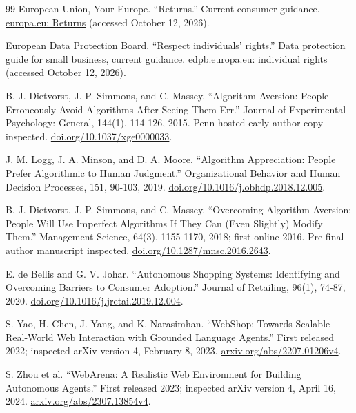 \documentclass{article}
\begin{document}
\begin{thebibliography}{99}
European Union, Your Europe. ``Returns.'' Current consumer guidance. \href{https://europa.eu/youreurope/citizens/consumers/shopping/returns/index_en.htm}{europa.eu: Returns} (accessed October 12, 2026).

European Data Protection Board. ``Respect individuals' rights.'' Data protection guide for small business, current guidance. \href{https://www.edpb.europa.eu/sme/be-compliant/respect-individuals-rights_en}{edpb.europa.eu: individual rights} (accessed October 12, 2026).

B. J. Dietvorst, J. P. Simmons, and C. Massey. ``Algorithm Aversion: People Erroneously Avoid Algorithms After Seeing Them Err.'' Journal of Experimental Psychology: General, 144(1), 114-126, 2015. Penn-hosted early author copy inspected. \href{https://doi.org/10.1037/xge0000033}{doi.org/10.1037/xge0000033}.

J. M. Logg, J. A. Minson, and D. A. Moore. ``Algorithm Appreciation: People Prefer Algorithmic to Human Judgment.'' Organizational Behavior and Human Decision Processes, 151, 90-103, 2019. \href{https://doi.org/10.1016/j.obhdp.2018.12.005}{doi.org/10.1016/j.obhdp.2018.12.005}.

B. J. Dietvorst, J. P. Simmons, and C. Massey. ``Overcoming Algorithm Aversion: People Will Use Imperfect Algorithms If They Can (Even Slightly) Modify Them.'' Management Science, 64(3), 1155-1170, 2018; first online 2016. Pre-final author manuscript inspected. \href{https://doi.org/10.1287/mnsc.2016.2643}{doi.org/10.1287/mnsc.2016.2643}.

E. de Bellis and G. V. Johar. ``Autonomous Shopping Systems: Identifying and Overcoming Barriers to Consumer Adoption.'' Journal of Retailing, 96(1), 74-87, 2020. \href{https://doi.org/10.1016/j.jretai.2019.12.004}{doi.org/10.1016/j.jretai.2019.12.004}.

S. Yao, H. Chen, J. Yang, and K. Narasimhan. ``WebShop: Towards Scalable Real-World Web Interaction with Grounded Language Agents.'' First released 2022; inspected arXiv version 4, February 8, 2023. \href{https://arxiv.org/abs/2207.01206v4}{arxiv.org/abs/2207.01206v4}.

S. Zhou et al. ``WebArena: A Realistic Web Environment for Building Autonomous Agents.'' First released 2023; inspected arXiv version 4, April 16, 2024. \href{https://arxiv.org/abs/2307.13854v4}{arxiv.org/abs/2307.13854v4}.


\end{thebibliography}
\end{document}
